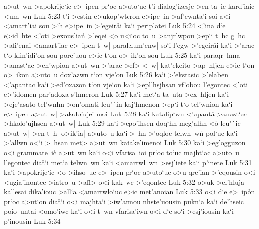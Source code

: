 a>ut~wn
>apokrije`ic
e>~ipen
pr`oc
a>uto`uc
t'i
dialog'izesje
>en
ta~ic
kard'iaic
<um~wn\bibvsend
\vs Luk 5:23
t'i
>estin
e>ukop'wteron
e>ipe~in
>af'ewnta'i
soi
a<i
<amart'iai
sou
>`h
e>ipe~in
>'egeir\r{a}i
ka`i
perip'atei\bibvsend
\vs Luk 5:24
<'ina
d`e
e>id~hte
<'oti
>exous'ian\r{}
>'eqei
<o
u<i`oc
to~u
>anjr'wpou
>ep`i
t~hc
g~hc
>afi'enai
<amart'iac
e>~ipen
t~w|
paralelum'enw|
so`i
l'egw
>'egeir\r{a}i
ka`i
>'arac
t`o
klin'idi'on
sou
pore'uou
e>ic
t`on
o>~ik'on
sou\bibvsend
\vs Luk 5:25
ka`i
paraqr~hma
>anast`ac
>en'wpion
a>ut~wn
>'arac
>ef>
<~w|\r{}
kat'ekeito
>ap~hljen
e>ic
t`on
o>~ikon
a>uto~u
dox'azwn
t`on
vje'on\bibvsend
\vs Luk 5:26
ka`i
>'ekstasic
>'elaben
<'apantac
ka`i
>ed'oxazon
t`on
vje`on
ka`i
>epl'hsjhsan
vf'obou
l'egontec
<'oti
e>'idomen
par'adoxa
s'hmeron\bibvsend
\vs Luk 5:27
ka`i
met`a
ta~uta
>ex~hljen
ka`i
>eje'asato
tel'wnhn
>on'omati
leu"`in
kaj'hmenon
>ep`i
t`o
tel'wnion
ka`i
e>~ipen
a>ut~w|
>akolo'ujei
moi\bibvsend
\vs Luk 5:28
ka`i
katalip`wn
<'apanta\r{}
>anast`ac
>hkolo'ujhsen
a>ut~w|\bibvsend
\vs Luk 5:29
ka`i
>epo'ihsen
doq`hn
meg'alhn
<o\r{}
leu"`ic
a>ut~w|
>en
t~h|
o>ik'ia|
a>uto~u
ka`i
>~hn
>'oqloc
telwn~wn\r{}
pol`uc
ka`i
>'allwn
o<`i
>~hsan
met>
a>ut~wn
katake'imenoi\bibvsend
\vs Luk 5:30
ka`i
>eg'ogguzon
o<i
grammate~ic\r{}
a>ut~wn
ka`i
o<i
vfarisa~ioi
pr`oc
to`uc
majht`ac
a>uto~u
l'egontec
dia\r{t}`i
met`a
\r{t}elwn~wn
ka`i
<amartwl~wn
>esj'iete
ka`i
p'inete\bibvsend
\vs Luk 5:31
ka`i
>apokrije`ic
<o
>ihso~uc
e>~ipen
pr`oc
a>uto`uc
o>u
qre'ian
>'eqousin
o<i
<ugia'inontec
>iatro~u
>al\r{l}>
o<i
kak~wc
>'eqontec\bibvsend
\vs Luk 5:32
o>uk
>el'hluja
kal'esai
dika'iouc
>all`a
<amartwlo`uc
e>ic
met'anoian\bibvsend
\vs Luk 5:33
o<i
d`e
e>~ip\r{o}n
pr`oc
a>ut`on
dia\r{t}`i
o<i
majhta`i
>iw'annou
nhste'uousin
pukn`a
ka`i
de'hseic
poio~untai
<omo'iwc
ka`i
o<i
t~wn
vfarisa'iwn
o<i
d`e
so`i
>esj'iousin
ka`i
p'inousin\bibvsend
\vs Luk 5:34
